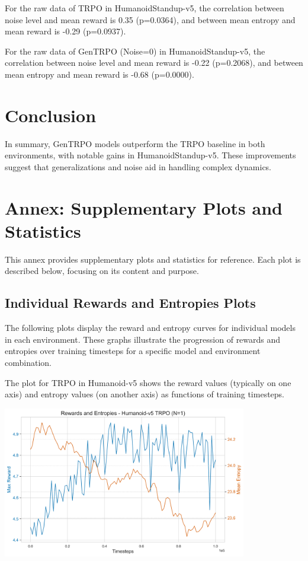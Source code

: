 \documentclass{svproc}
\begin{document}
For the raw data of TRPO in HumanoidStandup-v5, the correlation between noise level and mean reward is 0.35 (p=0.0364), and between mean entropy and mean reward is -0.29 (p=0.0937). 

For the raw data of GenTRPO (Noise=0) in HumanoidStandup-v5, the correlation between noise level and mean reward is -0.22 (p=0.2068), and between mean entropy and mean reward is -0.68 (p=0.0000). 


\section{Conclusion}
In summary, GenTRPO models outperform the TRPO baseline in both environments, with notable gains in HumanoidStandup-v5. These improvements suggest that generalizations and noise aid in handling complex dynamics.




\appendix
\section{Annex: Supplementary Plots and Statistics}

This annex provides supplementary plots and statistics for reference. Each plot is described below, focusing on its content and purpose.

\subsection{Individual Rewards and Entropies Plots}
The following plots display the reward and entropy curves for individual models in each environment. These graphs illustrate the progression of rewards and entropies over training timesteps for a specific model and environment combination.

The plot for TRPO in Humanoid-v5 shows the reward values (typically on one axis) and entropy values (on another axis) as functions of training timesteps.

\begin{center}
\includegraphics[width=0.8\textwidth]{graph_Humanoid-v5_trpo_rewards_entropies.png}
\end{center}
\end{document}
